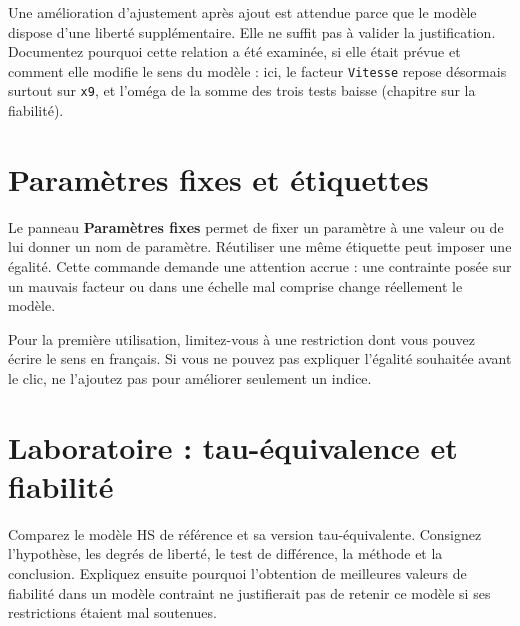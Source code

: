 \documentclass[
  french,
  11pt,
  a4paper,
  DIV=11,
  numbers=noendperiod]{scrreprt}
\begin{document}
Une amélioration d'ajustement après ajout est attendue parce que le
modèle dispose d'une liberté supplémentaire. Elle ne suffit pas à
valider la justification. Documentez pourquoi cette relation a été
examinée, si elle était prévue et comment elle modifie le sens du modèle
: ici, le facteur \texttt{Vitesse} repose désormais surtout sur
\texttt{x9}, et l'oméga de la somme des trois tests baisse (chapitre sur
la fiabilité).

\section{Paramètres fixes et
étiquettes}\label{paramuxe8tres-fixes-et-uxe9tiquettes}

Le panneau \textbf{Paramètres fixes} permet de fixer un paramètre à une
valeur ou de lui donner un nom de paramètre. Réutiliser une même
étiquette peut imposer une égalité. Cette commande demande une attention
accrue : une contrainte posée sur un mauvais facteur ou dans une échelle
mal comprise change réellement le modèle.

Pour la première utilisation, limitez-vous à une restriction dont vous
pouvez écrire le sens en français. Si vous ne pouvez pas expliquer
l'égalité souhaitée avant le clic, ne l'ajoutez pas pour améliorer
seulement un indice.

\section{Laboratoire : tau-équivalence et
fiabilité}\label{laboratoire-tau-uxe9quivalence-et-fiabilituxe9}

Comparez le modèle HS de référence et sa version tau-équivalente.
Consignez l'hypothèse, les degrés de liberté, le test de différence, la
méthode et la conclusion. Expliquez ensuite pourquoi l'obtention de
meilleures valeurs de fiabilité dans un modèle contraint ne justifierait
pas de retenir ce modèle si ses restrictions étaient mal soutenues.
\end{document}
